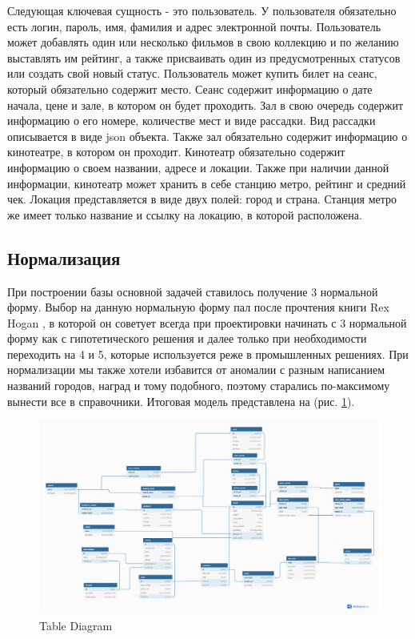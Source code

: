 \documentclass[a4paper,16pt]{article}
\begin{document}
Следующая ключевая сущность - это пользователь. У пользователя обязательно есть логин, пароль, имя, фамилия и адрес электронной почты. Пользователь может добавлять один или несколько фильмов в свою коллекцию и по желанию выставлять им рейтинг, а также присваивать один из предусмотренных статусов или создать свой новый статус. Пользователь может купить билет на сеанс, который обязательно содержит место. Сеанс содержит информацию о дате начала, цене и зале, в котором он будет проходить. Зал в свою очередь содержит информацию о его номере, количестве мест и виде рассадки. Вид рассадки описывается в виде json объекта. Также зал обязательно содержит информацию о кинотеатре, в котором он проходит. Кинотеатр обязательно содержит информацию о своем названии, адресе и локации. Также при наличии данной информации, кинотеатр может хранить в себе станцию метро, рейтинг и средний чек. Локация представляется в виде двух полей: город и страна. Станция метро же имеет только название и ссылку на локацию, в которой расположена.
\subsection{Нормализация}
При построении базы основной задачей ставилось получение 3 нормальной форму. Выбор на данную нормальную форму пал после прочтения книги Rex Hogan \cite{Norm}, в которой он советует всегда при проектировки начинать с 3 нормальной форму как с гипотетического решения и далее только при необходимости переходить на 4 и 5, которые используется реже в промышленных решениях. При нормализации мы также хотели избавится от аномалии с разным написанием названий городов, наград и тому подобного, поэтому старались по-максимому вынести все в справочники. Итоговая модель представлена на (рис. \ref{fig:tables}).

\begin{figure}[h]
    \centering
    \includegraphics[scale=0.15]{iMovie db.png}
    \caption{Table Diagram}
    \label{fig:tables}
\end{figure}
\end{document}
